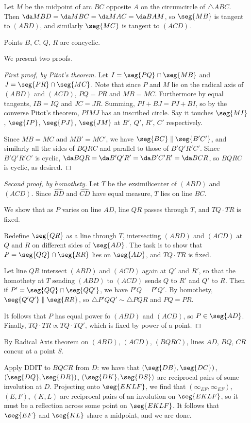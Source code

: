 Let $M$ be the midpoint of arc $BC$ opposite $A$ on the circumcircle of $\triangle ABC$. Then $\da MBD=\da MBC=\da MAC=\da BAM$, so $\seg{MB}$ is tangent to $(ABD)$, and similarly $\seg{MC}$ is tangent to $(ACD)$.
\begin{claim*}
    Points $B$, $C$, $Q$, $R$ are concyclic.
\end{claim*}
We present two proofs.
\begin{proof}[First proof, by Pitot's theorem]
    Let $I=\seg{PQ}\cap\seg{MB}$ and $J=\seg{PR}\cap\seg{MC}$. Note that since $P$ and $M$ lie on the radical axis of $(ABD)$ and $(ACD)$, $PQ=PR$ and $MB=MC$. Furthermore by equal tangents, $IB=IQ$ and $JC=JR$. Summing, $PI+BJ=PJ+BI$, so by the converse Pitot's theorem, $PIMJ$ has an inscribed circle. Say it touches $\seg{MI}$, $\seg{IP}$, $\seg{PJ}$, $\seg{JM}$ at $B'$, $Q'$, $R'$, $C'$ respectively.

    Since $MB=MC$ and $MB'=MC'$, we have $\seg{BC}\parallel\seg{B'C'}$, and similarly all the sides of $BQRC$ and parallel to those of $B'Q'R'C'$. Since $B'Q'R'C'$ is cyclic, $\da BQR=\da B'Q'R'=\da B'C'R'=\da BCR$, so $BQRC$ is cyclic, as desired.
\end{proof}
\begin{proof}[Second proof, by homothety]
    Let $T$ be the exsimilicenter of $(ABD)$ and $(ACD)$. Since $\widehat{BD}$ and $\widehat{CD}$ have equal measure, $T$ lies on line $BC$.

    We show that as $P$ varies on line $AD$, line $QR$ passes through $T$, and $TQ\cdot TR$ is fixed.

    Redefine $\seg{QR}$ as a line through $T$, intersecting $(ABD)$ and $(ACD)$ at $Q$ and $R$ on different sides of $\seg{AD}$. The task is to show that $P=\seg{QQ}\cap\seg{RR}$ lies on $\seg{AD}$, and $TQ\cdot TR$ is fixed.

    Let line $QR$ intersect $(ABD)$ and $(ACD)$ again at $Q'$ and $R'$, so that the homothety at $T$ sending $(ABD)$ to $(ACD)$ sends $Q$ to $R'$ and $Q'$ to $R$. Then if $P'=\seg{QQ}\cap\seg{QQ'}$, we have $P'Q=P'Q'$. By homothety, $\seg{Q'Q'}\parallel\seg{RR}$, so $\triangle P'QQ'\sim\triangle PQR$ and $PQ=PR$.

    It follows that $P$ has equal power fo $(ABD)$ and $(ACD)$, so $P\in\seg{AD}$. Finally, $TQ\cdot TR\propto TQ\cdot TQ'$, which is fixed by power of a point.
\end{proof}

By Radical Axis theorem on $(ABD)$, $(ACD)$, $(BQRC)$, lines $AD$, $BQ$, $CR$ concur at a point $S$.

Apply DDIT to $BQCR$ from $D$: we have that $(\seg{DB},\seg{DC})$, $(\seg{DQ},\seg{DR})$, $(\seg{DK},\seg{DS})$ are reciprocal pairs of some involution at $D$. Projecting onto $\seg{EKLF}$, we find that $(\infty_{EF},\infty_{EF})$, $(E,F)$, $(K,L)$ are reciprocal pairs of an involution on $\seg{EKLF}$, so it must be a reflection across some point on $\seg{EKLF}$. It follows that $\seg{EF}$ and $\seg{KL}$ share a midpoint, and we are done.

